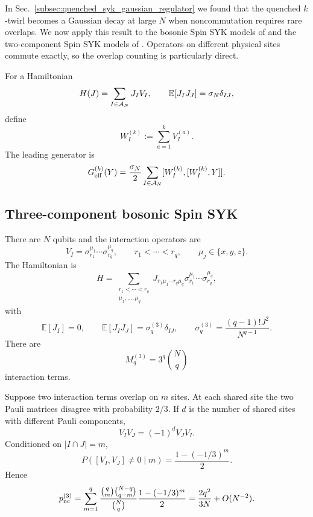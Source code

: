 \documentclass{article}
\theoremstyle{definition}
\begin{document}
In Sec.~\ref{subsec:quenched_syk_gaussian_regulator} we found that the
quenched $k$-twirl becomes a Gaussian decay at large $N$ when
noncommutation requires rare overlaps.  We now apply this result to the
bosonic Spin SYK models of \cite{swingle2024bosonic} and the two-component Spin
SYK models of \cite{basu2026complexity}.  Operators on different physical sites
commute exactly, so the overlap counting is particularly direct.

For a Hamiltonian
\begin{equation}
    H(J)=\sum_{I\in{\cal A}_N}J_IV_I,
    \qquad
    \mathbb E[J_IJ_J]=\sigma_N\delta_{IJ},
\end{equation}
define
\begin{equation}
    W_I^{(k)}:=\sum_{a=1}^kV_I^{(a)}.
\end{equation}
The leading generator is
\begin{equation}
    G_{\rm eff}^{(k)}(Y)
    =\frac{\sigma_N}{2}
    \sum_{I\in{\cal A}_N}
    [W_I^{(k)},[W_I^{(k)},Y]].
\end{equation}

\subsection{Three-component bosonic Spin SYK}

There are $N$ qubits and the interaction operators are
\begin{equation}
    V_I
    =\sigma_{r_1}^{\mu_1}\cdots\sigma_{r_q}^{\mu_q},
    \qquad
    r_1<\cdots<r_q,
    \qquad
    \mu_j\in\{x,y,z\}.
\end{equation}
The Hamiltonian is
\begin{equation}
    H
    =\sum_{\substack{r_1<\cdots<r_q\\
                      \mu_1,\ldots,\mu_q}}
    J_{r_1\mu_1\cdots r_q\mu_q}
    \sigma_{r_1}^{\mu_1}\cdots\sigma_{r_q}^{\mu_q},
\end{equation}
with
\begin{equation}
    \mathbb E[J_I]=0,
    \qquad
    \mathbb E[J_IJ_J]=\sigma_q^{(3)}\delta_{IJ},
    \qquad
    \sigma_q^{(3)}=\frac{(q-1)!J^2}{N^{q-1}}.
\end{equation}
There are
\begin{equation}
    M_q^{(3)}=3^q\binom Nq
\end{equation}
interaction terms.

Suppose two interaction terms overlap on $m$ sites.  At each shared site
the two Pauli matrices disagree with probability $2/3$.  If $d$ is the
number of shared sites with different Pauli components,
\begin{equation}
    V_IV_J=(-1)^dV_JV_I.
\end{equation}
Conditioned on $|I\cap J|=m$,
\begin{equation}
    P([V_I,V_J]\neq0\mid m)
    =\frac{1-(-1/3)^m}{2}.
\end{equation}
Hence
\begin{equation}
    p_{\rm nc}^{(3)}
    =\sum_{m=1}^q
    \frac{\binom qm\binom{N-q}{q-m}}{\binom Nq}
    \frac{1-(-1/3)^m}{2}
    =\frac{2q^2}{3N}+O(N^{-2}).
\end{equation}
\end{document}
